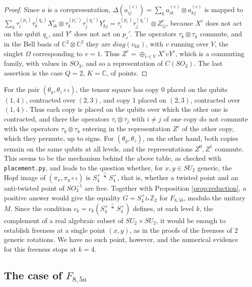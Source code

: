 \documentclass[11pt]{amsart}
\begin{document}
\begin{proof}
Since $a$ is a corepresentation, $\Delta(a^{(c)}_{ij})=\sum_ka^{(c)}_{ik}\otimes a^{(c)}_{kj}$ is mapped to $\sum_k\tau_i^{(p_c)}\tau_k^{(q_c)}X^c_{ik}\otimes\tau_k^{(p_c')}\tau_j^{(q_c')}Y^c_{kj}=\tau_i^{(p_c)}\tau_j^{(q_c')}\otimes Z^c_{ij}$, because $X^c$ does not act on the qubit $q_c$, and $Y^c$ does not act on $p_c'$. The operators $\tau_k\otimes\tau_k$ commute, and in the Bell basis of $\mathbb C^2\otimes\mathbb C^2$ they are $diag(v_{kk})$, with $v$ running over $V$, the singlet $\Omega$ corresponding to $v=1$. Thus $Z^c=\oplus_{v\in V}X^cvY^c$, which is a commuting family, with values in $SO_3$, and so a representation of $C(SO_3)$. The last assertion is the case $Q=2$, $K=\mathbb C$, of points.
\end{proof}

\noindent For the pair $(\theta_y,\theta_z\circ\iota)$, the tensor square has copy 0 placed on the qubits $(1,4)$, contracted over $(2,3)$, and copy 1 placed on $(2,3)$, contracted over $(1,4)$. Thus each copy is placed on the qubits over which the other one is contracted, and there the operators $\tau_i\otimes\tau_j$ with $i\neq j$ of one copy do not commute with the operators $\tau_k\otimes\tau_k$ entering in the representation $Z^c$ of the other copy, which they permute, up to signs. For $(\theta_y,\theta_z)$, on the other hand, both copies remain on the same qubits at all levels, and the representations $Z^0,Z^1$ commute. This seems to be the mechanism behind the above table, as checked with \texttt{placement.py}, and leads to the question whether, for $x,y\in SU_2$ generic, the Hopf image of $(\pi_x,\pi_y\circ\iota)$ is $S_4^+\,\hat{*}\,S_4^+$, that is, whether a twisted point and an anti-twisted point of $SO_3^{-1}$ are free. Together with Proposition \ref{prop:reduction}, a positive answer would give the equality $G=S_4^+\wr_*\mathbb Z_2$ for $F_{8,5b}$, modulo the unitary $M$. Since the condition $c_k=c_k(S_4^+\,\hat{*}\,S_4^+)$ defines, at each level $k$, the complement of a real algebraic subset of $SU_2\times SU_2$, it would be enough to establish freeness at a single point $(x,y)$, as in the proofs of the freeness of 2 generic rotations. We have no such point, however, and the numerical evidence for this freeness stops at $k=4$.

\medskip

\subsection{The case of $F_{8,5a}$}
\end{document}
